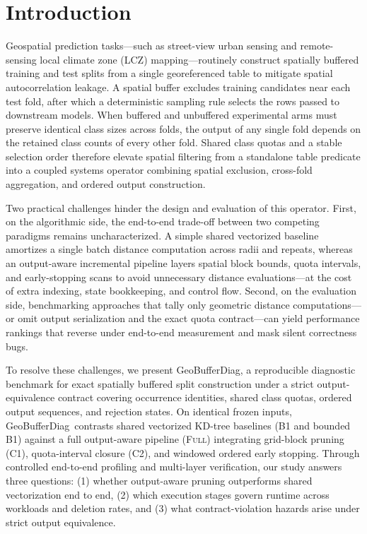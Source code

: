 \documentclass[sigconf, nonacm]{acmart}
\newcommand{\sys}{GeoBufferDiag}
\newcommand{\full}{\textsc{Full}}
\begin{document}
\section{Introduction}
Geospatial prediction tasks---such as street-view urban sensing and remote-sensing local climate zone (LCZ) mapping---routinely construct spatially buffered training and test splits from a single georeferenced table to mitigate spatial autocorrelation leakage. A spatial buffer excludes training candidates near each test fold, after which a deterministic sampling rule selects the rows passed to downstream models. When buffered and unbuffered experimental arms must preserve identical class sizes across folds, the output of any single fold depends on the retained class counts of every other fold. Shared class quotas and a stable selection order therefore elevate spatial filtering from a standalone table predicate into a coupled systems operator combining spatial exclusion, cross-fold aggregation, and ordered output construction.

Two practical challenges hinder the design and evaluation of this operator. First, on the algorithmic side, the end-to-end trade-off between two competing paradigms remains uncharacterized. A simple shared vectorized baseline amortizes a single batch distance computation across radii and repeats, whereas an output-aware incremental pipeline layers spatial block bounds, quota intervals, and early-stopping scans to avoid unnecessary distance evaluations---at the cost of extra indexing, state bookkeeping, and control flow. Second, on the evaluation side, benchmarking approaches that tally only geometric distance computations---or omit output serialization and the exact quota contract---can yield performance rankings that reverse under end-to-end measurement and mask silent correctness bugs.

To resolve these challenges, we present \sys, a reproducible diagnostic benchmark for exact spatially buffered split construction under a strict output-equivalence contract covering occurrence identities, shared class quotas, ordered output sequences, and rejection states. On identical frozen inputs, \sys\ contrasts shared vectorized KD-tree baselines (B1 and bounded B1) against a full output-aware pipeline (\full) integrating grid-block pruning (C1), quota-interval closure (C2), and windowed ordered early stopping. Through controlled end-to-end profiling and multi-layer verification, our study answers three questions: (1) whether output-aware pruning outperforms shared vectorization end to end, (2) which execution stages govern runtime across workloads and deletion rates, and (3) what contract-violation hazards arise under strict output equivalence.
\end{document}
